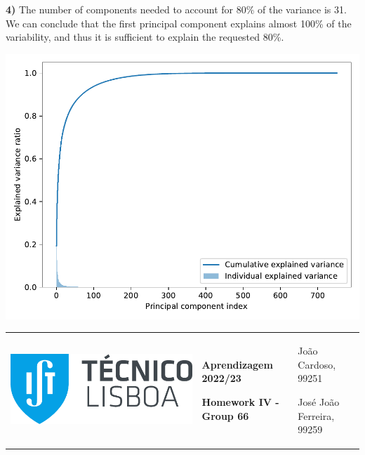 \documentclass[11pt,a4paper]{article}
\begin{document}
\begin{flushleft}
  \textbf{4)} The number of components needed to account for 80\% of the variance is 31. We can conclude that the first principal component explains almost 100\% of the variability, and thus it is sufficient to explain the requested 80\%. \par
  \vspace{-1mm}
  \begin{center}
    \includegraphics[scale=0.6]{hw04_plot_pca_variance.pdf}
  \end{center}
\end{flushleft}

\pagebreak
\hspace{-8.25mm}
\color{darkgray}
\renewcommand\tabularxcolumn[1]{m{#1}}
\begin{tabularx}{1.09\textwidth} {>{\raggedright\arraybackslash}X >{\centering\arraybackslash}X >{\raggedleft\arraybackslash}X}
  \includegraphics[scale=0.2]{tecnico.pdf}                           &
  \textbf{Aprendizagem 2022/23} \par \textbf{Homework IV - Group 66} &
  João Cardoso, 99251 \par José João Ferreira, 99259
\end{tabularx}
\renewcommand\tabularxcolumn[1]{p{#1}}
\color{black}
\end{document}
